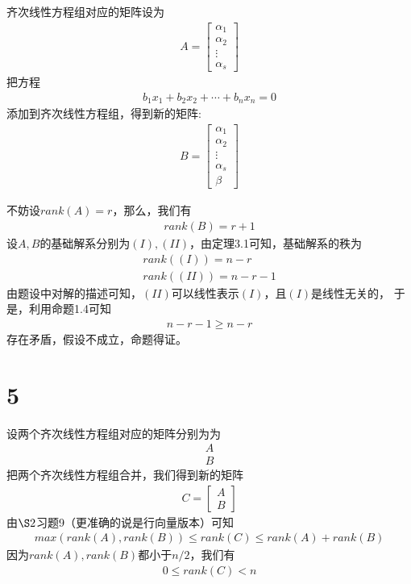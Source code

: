 \documentclass{article}
\begin{document}
齐次线性方程组对应的矩阵设为
\begin{align*}
  A = \begin{bmatrix}
        \alpha_1 \\
        \alpha_2 \\
        \vdots   \\
        \alpha_s
      \end{bmatrix}
\end{align*}
把方程
\begin{align*}
  b_1 x_1 + b_2 x_2 + \cdots + b_n x_n = 0
\end{align*}
添加到齐次线性方程组，得到新的矩阵:
\begin{align*}
  B = \begin{bmatrix}
        \alpha_1 \\
        \alpha_2 \\
        \vdots   \\
        \alpha_s \\
        \beta
      \end{bmatrix}
\end{align*}

不妨设$rank(A) = r$，那么，我们有
\begin{align*}
  rank(B) = r + 1
\end{align*}
设$A,B$的基础解系分别为$(I),(II)$，由定理3.1可知，基础解系的秩为
\begin{align*}
  rank((I)) = n - r \\
  rank((II)) = n - r - 1
\end{align*}
由题设中对解的描述可知，$(II)$可以线性表示$(I)$，且$(I)$是线性无关的，
于是，利用命题1.4可知
\begin{align*}
  n - r - 1 \geq n - r
\end{align*}
存在矛盾，假设不成立，命题得证。

\section*{5}

设两个齐次线性方程组对应的矩阵分别为为
\begin{align*}
  A \\
  B
\end{align*}
把两个齐次线性方程组合并，我们得到新的矩阵
\begin{align*}
  C = \begin{bmatrix}
        A \\
        B
      \end{bmatrix}
\end{align*}
由$\S 2$习题9（更准确的说是行向量版本）可知
\begin{align*}
  max(rank(A), rank(B)) \leq rank(C) \leq rank(A) + rank(B)
\end{align*}
因为$rank(A), rank(B)$都小于$n/2$，我们有
\begin{align*}
  0 \leq rank(C) < n
\end{align*}
\end{document}
